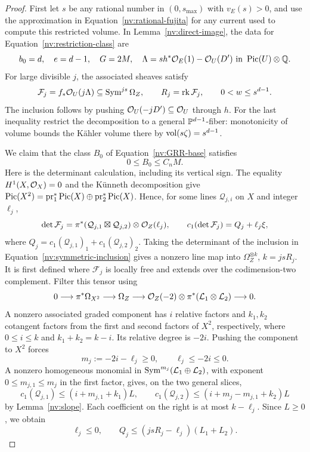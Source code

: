 \begin{proof}
First let \(s\) be any rational number in \((0,s_{\max})\) with
\(v_E(s)>0\), and use the approximation in
Equation~\eqref{nv:rational-fujita} for any current used
to compute this restricted volume.  In
Lemma~\ref{nv:direct-image}, the data for Equation~\eqref{nv:restriction-class}
are
\[
 b_0=d,\quad e=d-1,\quad G=2M,\quad
 \Lambda=s h^*\mathcal O_E(1)-\mathcal O_U(D')
           \ \text{in }\operatorname{Pic}(U)\otimes\mathbb Q.
\]
For large divisible \(j\), the associated sheaves satisfy
\begin{equation}\label{nv:symmetric-inclusion}
 \mathcal F_j=f_*\mathcal O_U(j\Lambda)
       \subseteq\operatorname{Sym}^{js}\Omega_Z,\qquad
 R_j=\operatorname{rk}\mathcal F_j,\qquad 0<w\le s^{d-1}.
\end{equation}
The inclusion follows by pushing
\(\mathcal O_U(-jD')\subseteq\mathcal O_U\) through \(h\).
For the last inequality restrict the decomposition to a general
\(\mathbb P^{d-1}\)-fiber: monotonicity of volume bounds the Kähler volume
there by \(\operatorname{vol}(s\zeta)=s^{d-1}\).

We claim that the class \(B_0\) of Equation~\eqref{nv:GRR-base} satisfies
\begin{equation}\label{nv:B0-bound}
 0\le B_0\le C_nM .
\end{equation}
Here is the determinant calculation, including its vertical sign.
The equality \(H^1(X,\mathcal O_X)=0\) and the Künneth decomposition give
\(\operatorname{Pic}(X^2)=\operatorname{pr}_1^*\operatorname{Pic}(X)\oplus\operatorname{pr}_2^*\operatorname{Pic}(X)\).  Hence, for some
lines \(\mathscr Q_{j,i}\) on \(X\) and integer \(\ell_j\),
\[
 \det\mathcal F_j
  =\pi^*(\mathcal{Q}_{j,1}\boxtimes\mathcal{Q}_{j,2})
       \otimes\mathcal O_Z(\ell_j),\qquad
 c_1(\det\mathcal F_j)=Q_j+\ell_j\xi,
\]
where \(Q_j=c_1(\mathscr Q_{j,1})_1+c_1(\mathscr Q_{j,2})_2\).
Taking the determinant of the inclusion in
Equation~\eqref{nv:symmetric-inclusion} gives a nonzero line
map into \(\Omega_Z^{\otimes k}\), \(k=jsR_j\).  It is first defined
where \(\mathcal F_j\) is locally free and extends over the
codimension-two complement.  Filter this tensor using
\[
 0\longrightarrow\pi^*\Omega_{X^2}\longrightarrow\Omega_Z
   \longrightarrow
   \mathcal O_Z(-2)\otimes\pi^*(\mathcal{L}_1\otimes\mathcal{L}_2)
   \longrightarrow0 .
\]
A nonzero associated graded component has \(i\) relative factors and
\(k_1,k_2\) cotangent factors from the first and second factors of \(X^2\),
respectively, where
\(0\le i\le k\) and \(k_1+k_2=k-i\).  Its relative degree is \(-2i\).
Pushing the component to \(X^2\) forces
\[
 m_j:=-2i-\ell_j\ge0,\qquad \ell_j\le-2i\le0.
\]
A nonzero homogeneous monomial in
\(\operatorname{Sym}^{m_j}(\mathcal{L}_1\oplus\mathcal{L}_2)\), with exponent
\(0\le m_{j,1}\le m_j\) in the first factor, gives, on the two general slices,
\[
 c_1(\mathscr Q_{j,1})\le(i+m_{j,1}+k_1)L,\qquad
 c_1(\mathscr Q_{j,2})\le(i+m_j-m_{j,1}+k_2)L
\]
by Lemma~\ref{nv:slope}.  Each coefficient on the right is at most
\(k-\ell_j\).  Since \(L\ge0\), we obtain
\begin{equation}\label{nv:determinant-bound-Z}
 \ell_j\le0,\qquad
 Q_j\le(jsR_j-\ell_j)(L_1+L_2).
\end{equation}


\end{proof}
